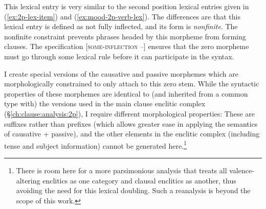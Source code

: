 \begin{singlespacing}
\ex \label{ex:svc-zero-morpheme}
\xe
\end{singlespacing}

This lexical entry is very similar to the second position lexical entries given in (\ref{ex:2p-lex-item}) and (\ref{ex:mood-2p-verb-lex}). The differences are that this lexical entry is defined as not fully inflected, and its form is \textit{nonfinite}. The nonfinite constraint prevents phrases headed by this morpheme from forming clauses. The specification [\textsc{some-inflection} --] ensures that the zero morpheme must go through some lexical rule before it can participate in the syntax.

I create special versions of the causative and passive morphemes which are morphologically constrained to only attach to this zero stem. While the syntactic properties of these morphemes are identical to (and inherited from a common type with) the versions used in the main clause enclitic complex (\S\ref{ch:clause:analysis:2p}), I require different morphological properties: These are suffixes rather than prefixes (which allows greater ease in applying the semantics of causative + passive), and the other elements in the enclitic complex (including tense and subject information) cannot be generated here.\footnote{There is room here for a more parsimonious analysis that treats all valence-altering enclitics as one category and clausal enclitics as another, thus avoiding the need for this lexical doubling. Such a reanalysis is beyond the scope of this work.}


